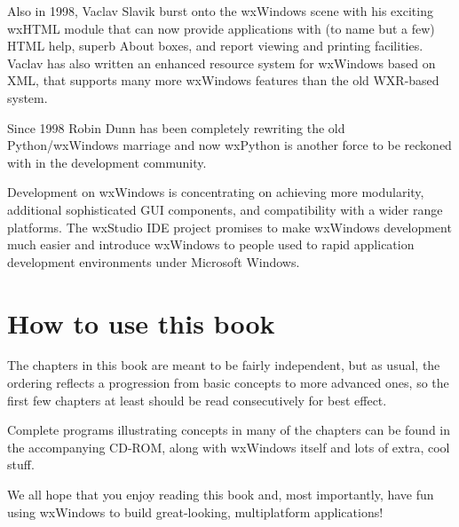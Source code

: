 Also in 1998, Vaclav Slavik burst onto the wxWindows scene with his
exciting wxHTML module that can now provide applications with (to name but a few) HTML help, superb
About boxes, and report viewing and printing facilities. Vaclav has
also written an enhanced resource system for wxWindows based on XML,
that supports many more wxWindows features than the old WXR-based system.

Since 1998 Robin Dunn has been completely rewriting the old Python/wxWindows
marriage and now wxPython is another force to be reckoned with in the
development community.

%
Development on wxWindows is concentrating on achieving more modularity,
additional sophisticated GUI components, and compatibility with
a wider range platforms. The wxStudio IDE project promises to
make wxWindows development much easier and introduce wxWindows to people
used to rapid application development environments under Microsoft Windows.

\section{How to use this book}

The chapters in this book are meant to be fairly independent, but
as usual, the ordering reflects a progression from basic concepts
to more advanced ones, so the first few chapters at least
should be read consecutively for best effect.

Complete programs illustrating concepts in many of the chapters can be
found in the accompanying CD-ROM, along with wxWindows itself and lots
of extra, cool stuff.

We all hope that you enjoy reading this book and, most importantly,
have fun using wxWindows to build great-looking, multiplatform applications!

